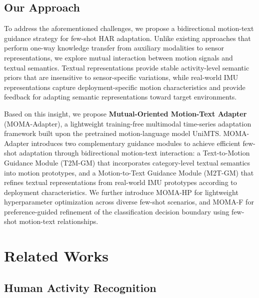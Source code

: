 \documentclass[journal]{IEEEtran}
\begin{document}
\subsection{Our Approach}

To address the aforementioned challenges, we propose a bidirectional motion-text guidance strategy for few-shot HAR adaptation. Unlike existing approaches that perform one-way knowledge transfer from auxiliary modalities to sensor representations, we explore mutual interaction between motion signals and textual semantics. Textual representations provide stable activity-level semantic priors that are insensitive to sensor-specific variations, while real-world IMU representations capture deployment-specific motion characteristics and provide feedback for adapting semantic representations toward target environments.

Based on this insight, we propose \textbf{Mutual-Oriented Motion-Text Adapter} (MOMA-Adapter), a lightweight training-free multimodal time-series adaptation framework built upon the pretrained motion-language model UniMTS. MOMA-Adapter introduces two complementary guidance modules to achieve efficient few-shot adaptation through bidirectional motion-text interaction: a Text-to-Motion Guidance Module (T2M-GM) that incorporates category-level textual semantics into motion prototypes, and a Motion-to-Text Guidance Module (M2T-GM) that refines textual representations from real-world IMU prototypes according to deployment characteristics. We further introduce MOMA-HP for lightweight hyperparameter optimization across diverse few-shot scenarios, and MOMA-F for preference-guided refinement of the classification decision boundary using few-shot motion-text relationships.

\section{Related Works}
\label{sec:related}

\subsection{Human Activity Recognition}
\end{document}
